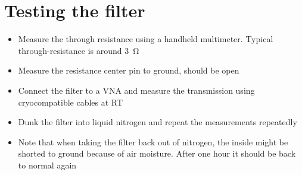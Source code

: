 \section{Testing the filter}
\begin{itemize}
	\item Measure the through resistance using a handheld multimeter. Typical through-resistance is around \SI{3}{\ohm}
	\item Measure the resistance center pin to ground, should be open
	\item Connect the filter to a VNA and measure the transmission using cryocompatible cables at RT
	\item Dunk the filter into liquid nitrogen and repeat the measurements repeatedly
	\item Note that when taking the filter back out of nitrogen, the inside might be shorted to ground because of air moisture. After one hour it should be back to normal again
\end{itemize}


